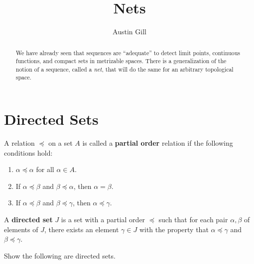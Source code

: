 \documentclass[12pt]{article}
\title{Nets}
\author{Austin Gill}
\begin{document}
\maketitle

\begin{abstract}
    We have already seen that sequences are ``adequate'' to detect limit points, continuous functions, and compact sets in metrizable spaces. There is a generalization of the notion of a sequence, called a \textit{net}, that will do the same for an arbitrary topological space.
\end{abstract}

\section{Directed Sets}
\begin{defn}
    A relation $\preceq$ on a set $A$ is called a \textbf{partial order} relation if the following conditions hold:
    \begin{enumerate}
        \item $\alpha \preceq \alpha$ for all $\alpha \in A$.
        \item If $\alpha \preceq \beta$ and $\beta \preceq \alpha$, then $\alpha = \beta$.
        \item If $\alpha \preceq \beta$ and $\beta \preceq \gamma$, then $\alpha \preceq \gamma$.
    \end{enumerate}
\end{defn}

\begin{defn}
    A \textbf{directed set} $J$ is a set with a partial order $\preceq$ such that for each pair $\alpha, \beta$ of elements of $J$, there exists an element $\gamma \in J$ with the property that $\alpha \preceq \gamma$ and $\beta \preceq \gamma$.
\end{defn}
Show the following are directed sets.
\end{document}

